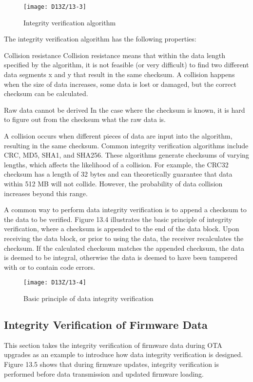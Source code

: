 \documentclass[a4paper,12pt]{book}
\begin{document}
\begin{figure}[!h]
    \centering
    \texttt{[image: D13Z/13-3]}
    \caption{Integrity verification algorithm}
\end{figure}

The integrity verification algorithm has the following properties: 

\begin{term}{Collision resistance}
    Collision resistance means that within the data length specified by the algorithm, it is not feasible (or very difficult) to find two different data segments x and y that result in the same checksum. A collision happens when the size of data increases, some data is lost or damaged, but the correct checksum can be calculated.
\end{term}

\begin{term}{Raw data cannot be derived}
    In the case where the checksum is known, it is hard to figure out from the checksum what the raw data is.
\end{term}

A collision occurs when different pieces of data are input into the algorithm, resulting in the same checksum. Common integrity verification algorithms include CRC, MD5, SHA1, and SHA256. These algorithms generate checksums of varying lengths, which affects the likelihood of a collision. For example, the CRC32 checksum has a length of 32 bytes and can theoretically guarantee that data within 512 MB will not collide. However, the probability of data collision increases beyond this range.

A common way to perform data integrity verification is to append a checksum to the data to be verified. Figure 13.4 illustrates the basic principle of integrity verification, where a checksum is appended to the end of the data block. Upon receiving the data block, or prior to using the data, the receiver recalculates the checksum. If the calculated checksum matches the appended checksum, the data is deemed to be integral, otherwise the data is deemed to have been tampered with or to contain code errors.

\begin{figure}[!h]
    \centering
    \texttt{[image: D13Z/13-4]}
    \caption{Basic principle of data integrity verification}
\end{figure}

\subsection{Integrity Verification of Firmware Data}
This section takes the integrity verification of firmware data during OTA upgrades as an example to introduce how data integrity verification is designed. Figure 13.5 shows that during firmware updates, integrity verification is performed before data transmission and updated firmware loading.
\end{document}
